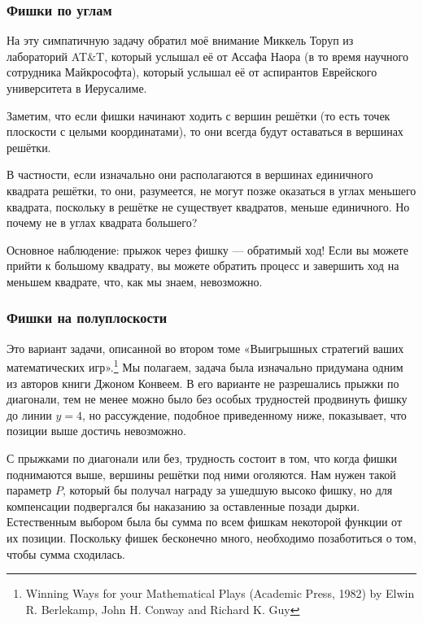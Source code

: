 \subsubsection*{Фишки по углам}%

На эту симпатичную задачу обратил моё внимание Миккель Торуп из лабораторий AT\&T, %
который услышал её от Ассафа Наора %
(в то время научного сотрудника Майкрософта), который услышал её от аспирантов Еврейского университета в Иерусалиме.

Заметим, что если фишки начинают ходить с вершин решётки (то есть точек плоскости с целыми координатами), то они всегда будут оставаться в вершинах решётки.

В частности, если изначально они располагаются в вершинах единичного квадрата решётки, то они, разумеется, не могут позже оказаться в углах меньшего квадрата, поскольку в решётке не существует квадратов, меньше единичного.
Но почему не в углах квадрата большего?

Основное наблюдение: прыжок через фишку --- обратимый ход! Если вы можете прийти к большому квадрату, вы можете обратить процесс и завершить ход на меньшем квадрате, что, как мы знаем, невозможно.
\heart

\subsubsection*{Фишки на полуплоскости}%

Это вариант задачи, описанной во втором томе «Выигрышных стратегий ваших математических игр».\footnote{Winning Ways for your Mathematical Plays (Academic Press, 1982) by Elwin R. Berlekamp, John H. Conway and Richard K. Guy}
Мы полагаем, задача была изначально придумана одним из авторов книги Джоном Конвеем.
В его варианте не разрешались прыжки по диагонали, тем не менее можно было без особых трудностей продвинуть фишку до линии $y = 4$, но рассуждение, подобное приведенному ниже, показывает, что позиции выше достичь невозможно.

С прыжками по диагонали или без, трудность состоит в том, что когда фишки поднимаются выше, вершины решётки под ними оголяются.
Нам нужен такой параметр $P$, который бы получал награду за ушедшую высоко фишку, но для компенсации подвергался бы наказанию за оставленные позади дырки.
Естественным выбором была бы сумма по всем фишкам некоторой функции от их позиции.
Поскольку фишек бесконечно много, необходимо позаботиться о том, чтобы сумма сходилась.

